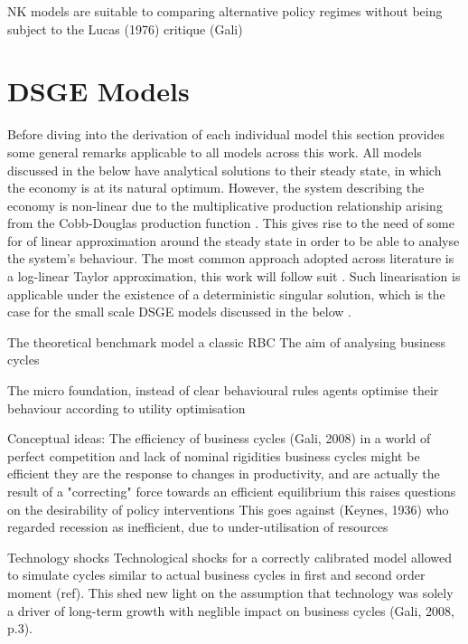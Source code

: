 \documentclass[12pt,a4paper,english]{article} %
\let\oldsection\section
\renewcommand\section{\clearpage\oldsection}
\begin{document}
	NK models are suitable to comparing alternative policy regimes without being subject to the Lucas (1976) critique (Gali)	



	\section{DSGE Models}
	
	Before diving into the derivation of each individual model this section provides some general remarks applicable to all models across this work. All models discussed in the below have analytical solutions to their steady state, in which the economy is at its natural optimum. However, the system describing the economy is non-linear due to the multiplicative production relationship arising from the Cobb-Douglas production function \cite{campbell_inspecting_1994}. This gives rise to the need of some for of linear approximation around the steady state in order to be able to analyse the system's behaviour. The most common approach adopted across literature is a log-linear Taylor approximation, this work will follow suit \cite{campbell_inspecting_1994}. Such linearisation is applicable under the existence of a deterministic singular solution, which is the case for the small scale DSGE models discussed in the below \cite{herbst_bayesian_2016}.
	
	The theoretical benchmark model a classic RBC 
	The aim of analysing business cycles
	
	The micro foundation, instead of clear behavioural rules agents optimise their behaviour according to utility optimisation
	
	Conceptual ideas:
	The efficiency of business cycles (Gali, 2008)
	in a world of perfect competition and lack of nominal rigidities business cycles might be efficient
	they are the response to changes in productivity, and are actually the result of a "correcting" force towards an efficient equilibrium
	this raises questions on the desirability of policy interventions
	This goes against (Keynes, 1936) who regarded recession as inefficient, due to under-utilisation of resources
	
	Technology shocks
	Technological shocks for a correctly calibrated model allowed to simulate cycles similar to actual business cycles in first and second order moment (ref). This shed new light on the assumption that technology was solely a driver of long-term growth with neglible impact on business cycles (Gali, 2008, p.3).
	
\end{document}
